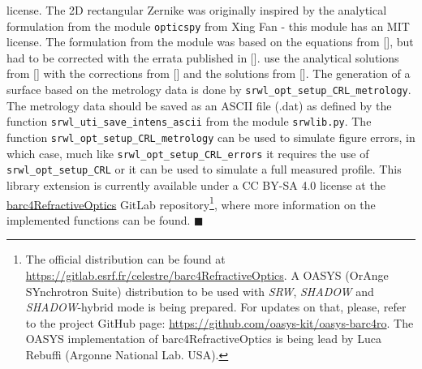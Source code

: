\begin{refsection}
{license. The 2D rectangular Zernike was originally inspired by the analytical formulation from the module \texttt{opticspy} from Xing Fan - this module has an MIT license. The formulation from the module was based on the equations from [\cite{Mahajan2007}], but had to be corrected with the errata published in [\cite{Mahajan2012}].} use the analytical solutions from [\cite{Mahajan2007}] with the corrections from [\cite{Mahajan2012}] and the solutions from [\cite{Mahajan2010}].  The generation of a surface based on the metrology data is done by \texttt{srwl\_opt\_setup\_CRL\_metrology}. The metrology data should be saved as an ASCII file (.dat) as defined by the function \texttt{srwl\_uti\_save\_intens\_ascii} from the module \texttt{srwlib.py}. The function \texttt{srwl\_opt\_setup\_CRL\_metrology} can be used to simulate figure errors, in which case, much like \texttt{srwl\_opt\_setup\_CRL\_errors} it requires the use of \texttt{srwl\_opt\_setup\_CRL} or it can be used to simulate a full measured profile. This library extension is currently available under a CC BY-SA 4.0 license at the \href{https://gitlab.esrf.fr/celestre/barc4RefractiveOptics}{barc4RefractiveOptics} GitLab repository\footnote{The official distribution can be found at \url{https://gitlab.esrf.fr/celestre/barc4RefractiveOptics}. A OASYS (OrAnge SYnchrotron Suite) distribution to be used with \textit{SRW}, \textit{SHADOW} and \textit{SHADOW}-hybrid mode is being prepared. For updates on that, please, refer to the project GitHub page: \url{https://github.com/oasys-kit/oasys-barc4ro}. The OASYS implementation of barc4RefractiveOptics is being lead by Luca Rebuffi (Argonne National Lab. USA).}, where more information on the implemented functions can be found. $\blacksquare$



\printbibliography[heading=subbibliography]
\end{refsection}

